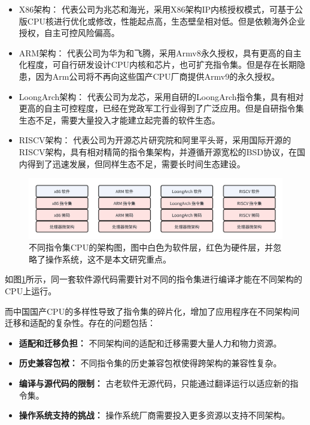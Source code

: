     \begin{itemize}
    \item {X86架构： } 代表公司为兆芯和海光，采用X86架构IP内核授权模式，可基于公版CPU核进行优化或修改，性能起点高，生态壁垒相对低。但是依赖海外企业授权，自主可控风险偏高。
    
    \item{ARM架构：} 代表公司为华为和飞腾，采用Armv8永久授权，具有更高的自主化程度，可自行研发设计CPU内核和芯片，也可扩充指令集。但是存在长期隐患，因为Arm公司将不再向这些国产CPU厂商提供Armv9的永久授权。
    
    \item{LoongArch架构：} 代表公司为龙芯，采用自研的LoongArch指令集，具有相对更高的自主可控程度，已经在党政军工行业得到了广泛应用。但是自研指令集生态不足，需要大量投入才能建立起完善的软件生态。
    
    \item{RISCV架构：} 代表公司为开源芯片研究院和阿里平头哥，采用国际开源的RISCV架构，具有相对精简的指令集架构，并遵循开源宽松的BSD协议，在国内得到了迅速发展，但同样生态不足，需要长时间生态建设。
    \end{itemize}


\begin{figure}[h]
    \centering
    \includegraphics[width=1\linewidth]{./feishuImage/allCPU_arch.png}
    \caption{不同指令集CPU的架构图，图中白色为软件层，红色为硬件层，并忽略了操作系统，这不是本文研究重点。\protect\footnotemark}
    \label{img:allCPU_arch}
  \end{figure}


如图\ref{img:allCPU_arch}所示，同一套软件源代码需要针对不同的指令集进行编译才能在不同架构的CPU上运行\footnotemark。


    而中国国产CPU的多样性导致了指令集的碎片化，增加了应用程序在不同架构间迁移和适配的复杂性。存在的问题包括：
    \begin{itemize}
    \item \textbf{适配和迁移负担：} 不同架构间的适配和迁移需要大量人力和物力资源。
    
    \item \textbf{历史兼容包袱：} 不同指令集的历史兼容包袱使得跨架构的兼容性复杂。
    
    \item \textbf{编译与源代码的限制：} 古老软件无源代码，只能通过翻译运行以适应新的指令集。
    
    \item \textbf{操作系统支持的挑战：} 操作系统厂商需要投入更多资源以支持不同架构。
    \end{itemize}

